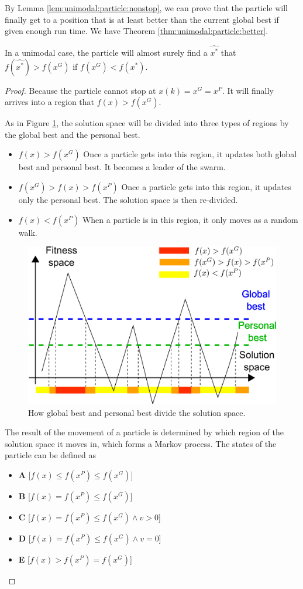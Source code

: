 By Lemma \ref{lem:unimodal:particle:nonstop}, we can prove that the particle will finally get to a position that is at least better than the current global best if given enough run time.
We have Theorem \ref{thm:unimodal:particle:better}.

\begin{mythm}
\label{thm:unimodal:particle:better}
In a unimodal case, the particle will almost surely find a $ \hat{x^{*}} $ that $ f(\hat{x^{*}}) > f(x^{G}) $ if $ f( x^{G} ) < f( x^{*}) $.
\begin{proof}
Because the particle cannot stop at $ x(k) = x^{G} = x^{P} $.
It will finally arrives into a region that $ f(x) > f(x^{G}) $.

As in Figure \ref{fig:categorize_regions}, the solution space will be divided into three types of regions by the global best and the personal best.
\begin{itemize}
\item $ f(x) > f(x^G) $
Once a particle gets into this region, it updates both global best and personal best. 
It becomes a leader of the swarm.
\item $ f(x^{G}) > f(x) > f(x^{P}) $
Once a particle gets into this region, it updates only the personal best.
The solution space is then re-divided.
\item $ f(x) < f(x^{P}) $
When a particle is in this region, it only moves as a random walk.
\end{itemize}

\begin{figure}
\centering
\includegraphics[width=0.7\linewidth]{./fig/categorize_regions}
\caption{How global best and personal best divide the solution space.}
\label{fig:categorize_regions}
\end{figure}

The result of the movement of a particle is determined by which region of the solution space it moves in, which forms a Markov process.
The states of the particle can be defined as
\begin{itemize}
\item \textbf{A} [$ f(x) \leq f(x^{P}) \leq f(x^{G}) $]
\item \textbf{B} [$ f(x) = f(x^{P}) \leq f(x^{G}) $] 
\item \textbf{C} [$ f(x) = f(x^{P}) \leq f(x^{G}) \land v > 0 $]
\item \textbf{D} [$ f(x) = f(x^{P}) \leq f(x^{G}) \land v = 0 $]
\item \textbf{E} [$ f(x) > f(x^{P}) = f(x^{G}) $]
\end{itemize}


\end{proof}
\end{mythm}
